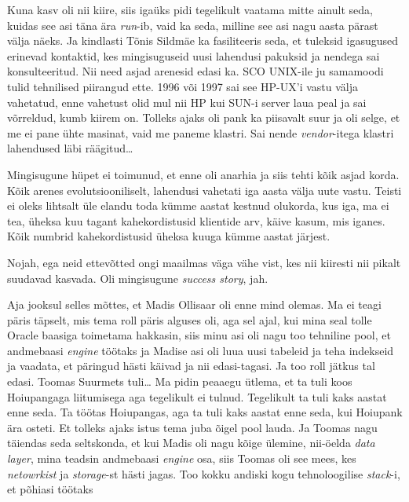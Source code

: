 Kuna  kasv oli nii kiire, siis igaüks pidi tegelikult vaatama  mitte ainult 
seda, kuidas see asi täna ära \emph{run}-ib, vaid ka seda, milline see asi nagu 
aasta pärast välja näeks. Ja kindlasti Tõnis Sildmäe 
ka fasiliteeris seda, et tuleksid igasugused erinevad kontaktid, kes 
mingisuguseid uusi lahendusi pakuksid ja nendega sai konsulteeritud. Nii need 
asjad arenesid edasi ka. SCO UNIX-ile ju samamoodi  tulid tehnilised piirangud 
ette. 1996 või 1997 sai see HP-UX'i vastu välja vahetatud, enne 
vahetust olid mul nii HP kui SUN-i server laua peal ja sai võrreldud, kumb  
kiirem on. Tolleks ajaks oli pank ka piisavalt suur ja oli selge, et me  ei 
pane ühte masinat, vaid me paneme klastri. Sai nende \emph{vendor}-itega  
klastri lahendused läbi räägitud\ldots

Mingisugune hüpet ei toimunud, et enne oli anarhia ja siis  tehti kõik asjad 
korda. Kõik arenes evolutsiooniliselt, lahendusi vahetati iga aasta välja uute 
vastu. Teisti ei oleks lihtsalt üle elandu toda kümme aastat kestnud olukorda, 
kus iga, ma ei tea, üheksa kuu tagant  kahekordistusid klientide arv, käive 
kasum, mis iganes. Kõik numbrid kahekordistusid üheksa kuuga kümme aastat 
järjest.


Nojah, ega neid ettevõtted ongi maailmas väga vähe vist, kes nii kiiresti nii 
pikalt suudavad kasvada. Oli mingisugune \emph{success story}, jah.


Aja jooksul selles mõttes, et Madis Ollisaar oli 
enne mind olemas. Ma ei teagi päris täpselt, mis tema roll päris alguses oli, 
aga sel ajal, kui mina seal tolle Oracle baasiga toimetama hakkasin, siis minu 
asi oli nagu too tehniline pool, et andmebaasi \emph{engine} töötaks ja Madise 
asi oli luua uusi tabeleid ja teha indekseid ja vaadata, et päringud hästi 
käivad ja nii edasi-tagasi. Ja too roll jätkus tal edasi. Toomas 
Suurmets tuli\ldots
Ma pidin peaaegu ütlema, et ta tuli koos Hoiupangaga liitumisega aga tegelikult 
ei tulnud. Tegelikult ta tuli kaks aastat enne seda. Ta töötas Hoiupangas, aga 
ta tuli kaks aastat enne seda, kui Hoiupank ära osteti. Et tolleks ajaks istus 
tema juba õigel pool lauda. Ja Toomas  nagu täiendas seda seltskonda, et kui 
Madis oli nagu kõige ülemine, nii-öelda \emph{data layer}, mina teadsin 
andmebaasi \emph{engine} osa, siis Toomas oli see mees, kes \emph{netowrkist} 
ja \emph{storage}-st hästi jagas.  Too kokku andiski kogu tehnoloogilise 
\emph{stack}-i, et põhiasi töötaks

